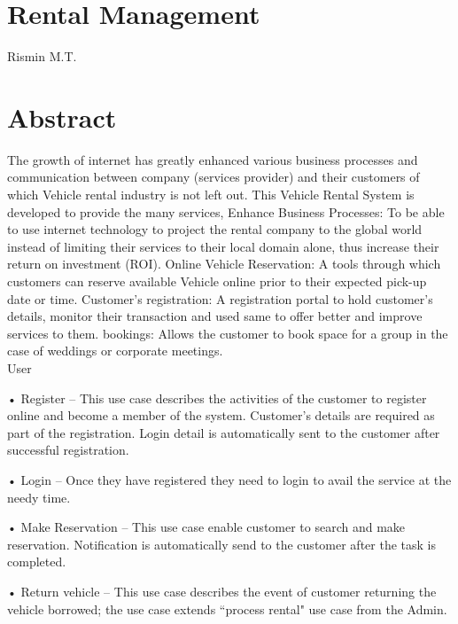 \documentclass[a4paper,12pt]{report}
\begin{document}
\chapter*{\centering Rental Management}
\begin{center}
{\Large  Rismin M.T. }\\


\end{center}
\chapter*{\centering Abstract}

	\hspace*{12pt}The growth of internet has greatly enhanced various business processes and communication between company (services provider) and their customers of which Vehicle rental industry is not left out. This Vehicle Rental System is developed to provide the many services, Enhance Business Processes: To be able to use internet technology to project the rental company to the global world instead of limiting their services to their local domain alone, thus increase their return on investment (ROI). Online Vehicle Reservation: A tools through which customers can reserve available Vehicle online prior to their expected pick-up date or time. Customer’s registration: A registration portal to hold customer’s details, monitor their transaction and used same to offer better and improve services to them. bookings: Allows the customer to book space for a group in the case of weddings or corporate meetings. \\
	
	
	\newpage
	\hspace*{12pt} User
	
	• Register – This use case describes the activities of the customer to register online and become a member of the system. Customer's details are required as part of the registration. Login detail is automatically sent to the customer after successful registration.
	
	• Login – Once they have registered they need to login to avail the service at the needy time.
	
	• Make Reservation – This use case enable customer to search and make reservation. Notification is automatically send to the customer after the task is completed.
	
	• Return vehicle – This use case describes the event of customer returning the vehicle borrowed; the use case extends “process rental" use case from the Admin.
	
\end{document}
